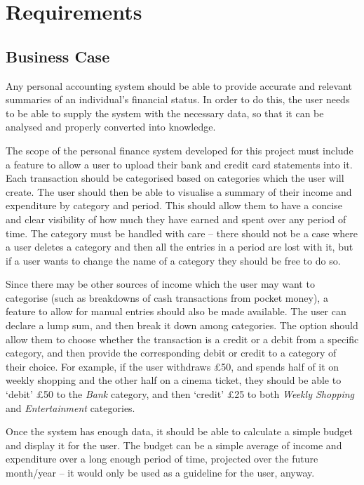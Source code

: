 \section{Requirements} \label{sec:Requirements}

\subsection{Business Case} \label{sec:Requirements.BusinessCase}
Any personal accounting system should be able to provide accurate and relevant
summaries of an individual's financial status. In order to do this, the user
needs to be able to supply the system with the necessary data, so that it can
be analysed and properly converted into knowledge.

The scope of the personal finance system developed for this project must
include a feature to allow a user to upload their bank and credit card
statements into it. Each transaction should be categorised based on categories
which the user will create. The user should then be able to visualise a summary
of their income and expenditure by category and period. This should allow them
to have a concise and clear visibility of how much they have earned and spent
over any period of time. The category must be handled with care -- there should
not be a case where a user deletes a category and then all the entries in a
period are lost with it, but if a user wants to change the name of a category
they should be free to do so.

Since there may be other sources of income which the user may want to
categorise (such as breakdowns of cash transactions from pocket money), a
feature to allow for manual entries should also be made available. The user can
declare a lump sum, and then break it down among categories. The option should
allow them to choose whether the transaction is a credit or a debit from a
specific category, and then provide the corresponding debit or credit to a
category of their choice. For example, if the user withdraws \pounds50, and
spends half of it on weekly shopping and the other half on a cinema ticket,
they should be able to `debit' \pounds50 to the \emph{Bank} category, and then
`credit' \pounds25 to both \emph{Weekly Shopping} and \emph{Entertainment}
categories.

Once the system has enough data, it should be able to calculate a simple budget
and display it for the user. The budget can be a simple average of income and
expenditure over a long enough period of time, projected over the future
month/year -- it would only be used as a guideline for the user, anyway.


